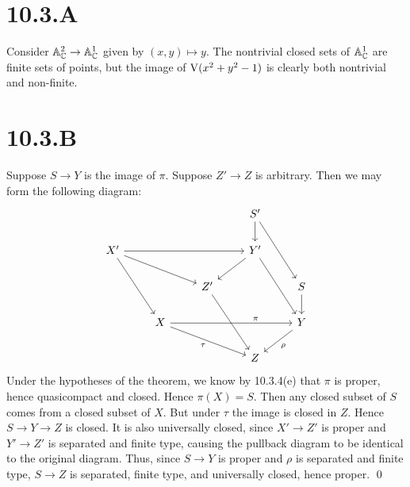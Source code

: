 \documentclass{article}
\begin{document}
\section{10.3.A}
Consider $\mathbb{A}^2_{\mathbb{C}} \to \mathbb{A}^1_{\mathbb{C}}$ given by $(x,y) \mapsto y$. The
nontrivial closed sets of $\mathbb{A}^1_{\mathbb{C}}$ are finite sets of points,
but the image of $\operatorname{V}(x^2+y^2-1)$ is clearly both nontrivial and
non-finite.

\section{10.3.B}
Suppose $S \to Y$ is the image of $\pi$.
Suppose $Z' \to Z$ is arbitrary. Then we may form the following
diagram: \[\begin{tikzcd}
         &   &      & {S'}     \\{X'} &   &  & {Y'} \\
         &   & {Z'} & {}                                    & S           \\
         & X &      &                                       & Y           \\
         &   &      & Z
        \arrow["\pi"{pos=0.7}, from=4-2, to=4-5]
        \arrow["\tau"', from=4-2, to=5-4]
        \arrow["\rho", from=4-5, to=5-4]
        \arrow[from=3-5, to=4-5]
        \arrow[from=1-4, to=3-5]
        \arrow[from=2-4, to=4-5]
        \arrow[from=1-4, to=2-4]
        \arrow[from=2-1, to=4-2]
        \arrow[from=2-1, to=2-4]
        \arrow[from=2-1, to=3-3]
        \arrow[from=2-4, to=3-3]
        \arrow[from=3-3, to=5-4]
    \end{tikzcd}\] Under the hypotheses of the theorem, we know
by 10.3.4(e) that $\pi$ is proper, hence quasicompact and
closed. Hence $\pi(X)=S$. Then any closed subset of
$S$ comes from a closed subset of $X$.
But under $\tau$ the image is closed in
$Z$. Hence $S \to Y \to Z$ is closed. It is also
universally closed, since $X' \to Z'$ is proper and
$Y' \to Z'$ is separated and finite type, causing the pullback
diagram to be identical to the original diagram. Thus, since
$S \to Y$ is proper and $\rho$ is separated and
finite type, $S \to Z$ is separated, finite type, and universally
closed, hence proper. \qed
\end{document}
